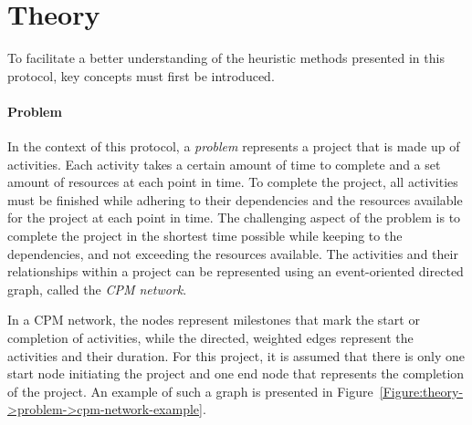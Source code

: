 \section{Theory}\label{Section:theory}
To facilitate a better understanding of the heuristic methods presented in this protocol, key concepts must first be introduced.

\paragraph{Problem}
In the context of this protocol, a \textit{problem} represents a project that is made up of activities.
Each activity takes a certain amount of time to complete and a set amount of resources at each point in time.
To complete the project, all activities must be finished while adhering to their dependencies and the resources available for the project at each point in time.
The challenging aspect of the problem is to complete the project in the shortest time possible while keeping to the dependencies, and not exceeding the resources available. The activities and their relationships within a project can be represented using an event-oriented directed graph, called the \textit{CPM network}.

In a CPM network, the nodes represent milestones that mark the start or completion of activities, while the directed, weighted edges represent the activities and their duration.
For this project, it is assumed that there is only one start node initiating the project and one end node that represents the completion of the project.
An example of such a graph is presented in Figure~\ref{Figure:theory->problem->cpm-network-example}.


